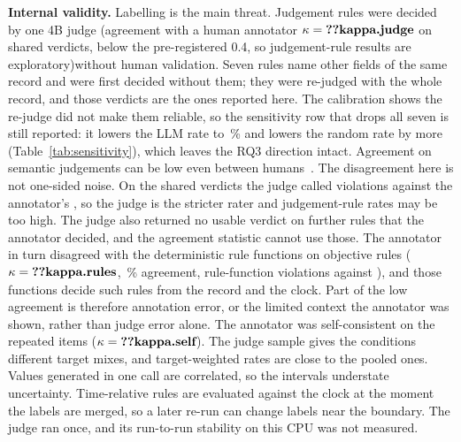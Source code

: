 \documentclass[conference]{IEEEtran}
\begin{document}
\textbf{Internal validity.} Labelling is the main threat. Judgement rules were decided by one 4B judge
\ifhumanlabels (agreement with a human annotator $\kappa=\R{kappa.judge}$ on  shared
verdicts, below the pre-registered 0.4, so judgement-rule results are exploratory)\else without human
validation\fi. Seven rules name other fields of the same record and were first decided without them;
they were re-judged with the whole record, and those verdicts are the ones reported here. The
calibration shows the re-judge did not make them reliable, so the sensitivity row that drops all seven
is still reported: it lowers the LLM rate to \,\% and lowers the random rate by
more (Table~\ref{tab:sensitivity}), which leaves the RQ3 direction intact. Agreement on semantic judgements
can be low even between humans~\cite{calo2026semanticgap}.\ifhumanlabels{} The disagreement here is not
one-sided noise. On the shared verdicts the judge called  violations against the
annotator's , so the judge is the stricter rater and judgement-rule rates may be
too high. The judge also returned no usable verdict on  further rules that the
annotator decided, and the agreement statistic cannot use those. The annotator in turn disagreed with
the deterministic rule functions on objective rules ($\kappa=\R{kappa.rules}$, \,\%
agreement,  rule-function violations against ), and those
functions decide such rules from the record and the clock. Part of the low agreement is therefore
annotation error, or the limited context the annotator was shown, rather than judge error alone. The
annotator was self-consistent on the repeated items ($\kappa=\R{kappa.self}$).\fi{} The judge sample
gives the conditions different target mixes, and target-weighted rates are close to the pooled ones.
Values generated in one call are correlated, so the intervals understate uncertainty. Time-relative
rules are evaluated against the clock at the moment the labels are merged, so a later re-run can change
labels near the boundary. The judge ran once, and its run-to-run stability on this CPU was not
measured.
\end{document}
